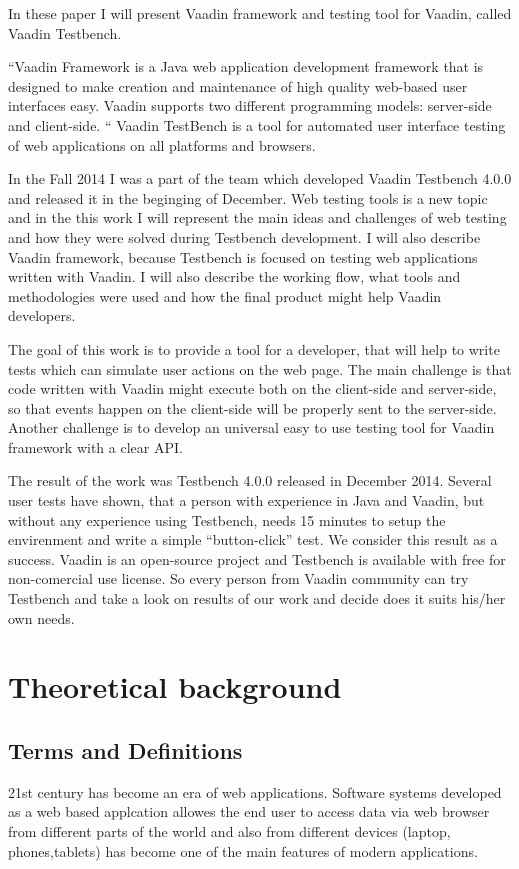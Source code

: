 \documentclass{article}
\begin{document}
	 In these paper I will present Vaadin framework and testing tool for Vaadin,
	 called Vaadin Testbench.
	
	``Vaadin Framework is a Java web application development framework that is
	designed to make creation and maintenance of high quality web-based user interfaces easy.
	 Vaadin supports two different programming models: server-side and client-side. 
	 `` \cite[pr1.1]{bookVaaidn}
	 Vaadin TestBench is a tool for automated user interface testing of web
	 applications on all platforms and browsers. \cite{vaadinTestbenchSite}
	 
	 In the Fall 2014 I was a part of the team which developed Vaadin Testbench
	 4.0.0 and released it in the beginging of December. Web testing tools is a
	 new topic and in the this work I will represent the main ideas and challenges
	 of web testing and how they were solved during Testbench development. I will
	 also describe Vaadin framework, because Testbench is focused on testing web
	 applications written with Vaadin. I will also describe the working flow, what
	 tools and methodologies were used and how the final product might help Vaadin
	 developers.
	 
	 The goal of this work is to provide a tool for a developer, that will help to
	 write tests which can simulate user actions on the web page. The main
	 challenge is that code written with Vaadin might execute both on the
	 client-side and server-side, so that events happen on the client-side will be
	 properly sent to the server-side. Another challenge is to develop an universal
	 easy to use testing tool for Vaadin framework with a clear API.
	 
	  The result of the work was Testbench 4.0.0 released in December 2014.
	  Several user tests have shown, that a person with experience in Java and
	  Vaadin, but without any experience using Testbench, needs 15 minutes to setup
	  the envirenment and write a simple ``button-click'' test. We consider this
	  result as a success. Vaadin is an open-source project and Testbench is
	  available with free for non-comercial use license. So every person from Vaadin community can try
	  Testbench and take a look on results of our work and decide does it suits
	  his/her own needs.
	 
\section{Theoretical background}

	\subsection{Terms and Definitions}
		21st century has become an era of web applications. Software systems developed
		as a web based applcation allowes the end user to access data via web browser
		from different parts of the world and also from different devices (laptop,
		phones,tablets) has become one of the main features of modern
		applications. 
		
\end{document}
